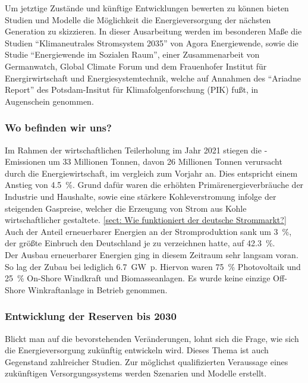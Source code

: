 		Um jetztige Zustände und künftige Entwicklungen bewerten zu können bieten Studien und Modelle die Möglichkeit die Energieversorgung der nächsten Generation zu skizzieren. In dieser Ausarbeitung werden im besonderen Maße die Studien "`Klimaneutrales Stromsystem 2035"' von Agora Energiewende, sowie die Studie "`Energiewende im Sozialen Raum"', einer Zusammenarbeit von Germanwatch, Global Climate Forum und dem Frauenhofer Institut für Energirwirtschaft und Energiesystemtechnik, welche auf Annahmen des "`Ariadne Report"' des Potsdam-Insitut für Klimafolgenforschung (PIK) fußt, in Augenschein genommen.\\

		\subsubsection{Wo befinden wir uns?}
		Im Rahmen der wirtschaftlichen Teilerholung im Jahr 2021 stiegen die \SI{}{\COtwo}-Emissionen um 33 Millionen Tonnen, davon 26 Millionen Tonnen verursacht durch die Energiewirtschaft, im vergleich zum Vorjahr an. Dies entspricht einem Anstieg von \SI{4,5}{\percent}.\cite[S.5]{Stand_der_Dinge} Grund dafür waren die erhöhten Primärenergieverbräuche der Industrie und Haushalte, sowie eine stärkere Kohleverstromung infolge der steigenden Gaspreise, welcher die Erzeugung von Strom aus Kohle wirtschaftlicher gestaltete. \ref{sect: Wie funktioniert der deutsche Strommarkt?} Auch der Anteil erneuerbarer Energien an der Stromproduktion sank um \SI{3}{\percent}, der größte Einbruch den Deutschland je zu verzeichnen hatte, auf \SI{42,3}{\percent}.\cite[S.5]{Stand_der_Dinge}\\
		
		Der Ausbau erneuerbarer Energien ging in diesem Zeitraum sehr langsam voran. So lag der Zubau bei lediglich \SI{6,7}{\giga \watt p}. Hiervon waren \SI{75}{\percent} Photovoltaik und \SI{25}{\percent} On-Shore Windkraft und Biomasseanlagen. Es wurde keine einzige Off-Shore Winkraftanlage in Betrieb genommen. \cite[S.47 ff.]{Stand_der_Dinge}
		
		
		\subsubsection{Entwicklung der Reserven bis 2030} \label{sect: 2030}
		Blickt man auf die bevorstehenden Veränderungen, lohnt sich die Frage, wie sich die Energieversorgung zukünftig entwickeln wird. Dieses Thema ist auch Gegenstand zahlreicher Studien. Zur möglichst qualifizierten Veraussage eines zukünftigen Versorgungssystems werden Szenarien und Modelle erstellt.\\
		
